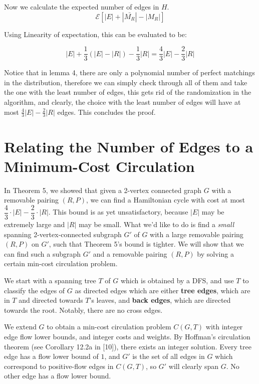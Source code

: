 \documentclass[12pt]{article}
\begin{document}
Now we calculate the expected number of edges in $H$.
\begin{equation}
\mathcal{E}[|E|+|\bar{M_R}|-|M_R|]
\end{equation}

Using Linearity of expectation, this can be evaluated to be:

\begin{equation}
|E| + \frac{1}{3}(|E|-|R|)-\frac{1}{3}|R| = \frac{4}{3}|E|-\frac{2}{3}|R|
\end{equation}

Notice that in lemma 4, there are only a polynomial number of perfect matchings in the distribution, therefore we can simply check through all of them and take the one with the least number of edges, this gets rid of the randomization in the algorithm, and clearly, the choice with the least number of edges will have at most $\frac{4}{3}|E|-\frac{2}{3}|R|$ edges. This concludes the proof.


\section{Relating the Number of Edges to a Minimum-Cost Circulation}

In Theorem 5, we showed that given a 2-vertex connected graph $G$ with a
removable pairing $(R, P)$, we can find a Hamiltonian cycle with cost at most
$\dfrac{4}{3} \cdot |E| - \dfrac{2}{3} \cdot |R|$.  This bound is as yet
unsatisfactory, because $|E|$ may be extremely large and $|R|$ may be small.
What we'd like to do is find a \emph{small} spanning 2-vertex-connected
subgraph $G'$ of $G$ with a large removable pairing $(R, P)$ on $G'$, such that
Theorem 5's bound is tighter.  We will show that we can find such a subgraph
$G'$ and a removable pairing $(R,P)$ by solving a certain min-cost circulation
problem.

We start with a spanning tree $T$ of $G$ which is obtained by a DFS, and use
$T$ to classify the edges of $G$ as directed edges which are either {\bf tree
edges}, which are in $T$ and directed towards $T$'s leaves, and {\bf back
edges}, which are directed towards the root.  Notably, there are no cross edges.

We extend $G$ to obtain a min-cost circulation problem $C(G, T)$ with integer
edge flow lower bounds, and integer costs and weights.  By Hoffman's circulation
theorem (see Corollary 12.2a in [10]), there exists an integer solution. Every tree edge has a
flow lower bound of $1$, and $G'$ is the set of all edges in $G$ which
correspond to positive-flow edges in $C(G,T)$, so $G'$ will clearly span $G$.
No other edge has a flow lower bound.  
\end{document}
